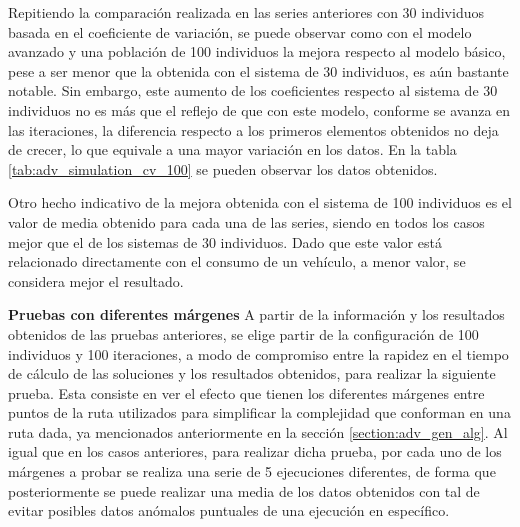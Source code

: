 \documentclass[11pt,spanish,listoffigures,listoftables]{tfgetsinf}
\begin{document}
Repitiendo la comparación realizada en las series anteriores con 30 individuos basada en el coeficiente de variación, se puede observar como  con el modelo avanzado y una población de 100 individuos la mejora respecto al modelo básico, pese a ser menor que la obtenida con el sistema de 30 individuos, es aún bastante notable. Sin embargo, este aumento de los coeficientes respecto al sistema de 30 individuos no es más que el reflejo de que con este modelo, conforme se avanza en las iteraciones, la diferencia respecto a los primeros elementos obtenidos no deja de crecer, lo que equivale a una mayor variación en los datos. En la tabla \ref{tab:adv_simulation_cv_100} se pueden observar los datos obtenidos.

Otro hecho indicativo de la mejora obtenida con el sistema de 100 individuos es el valor de media obtenido para cada una de las series, siendo en todos los casos mejor que el de los sistemas de 30 individuos. Dado que este valor está relacionado directamente con el consumo de un vehículo, a menor valor, se considera mejor el resultado.

\newpage 
\textbf{Pruebas con diferentes márgenes}\newline
A partir de la información y los resultados obtenidos de las pruebas anteriores, se elige partir de la configuración de 100 individuos y 100 iteraciones, a modo de compromiso entre la rapidez en el tiempo de cálculo de las soluciones y los resultados obtenidos, para realizar la siguiente prueba. Esta consiste en ver el efecto que tienen los diferentes márgenes entre puntos de la ruta utilizados para simplificar la complejidad que conforman en una ruta dada, ya mencionados anteriormente en la sección \ref{section:adv_gen_alg}. Al igual que en los casos anteriores, para realizar dicha prueba, por cada uno de los márgenes a probar se realiza una serie de 5 ejecuciones diferentes, de forma que posteriormente se puede realizar una media de los datos obtenidos con tal de evitar posibles datos anómalos puntuales de una ejecución en específico.
\end{document}
